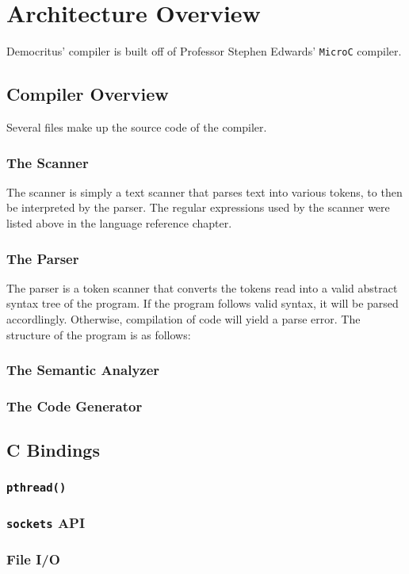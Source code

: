 \chapter{Architecture Overview}
	Democritus' compiler is built off of Professor Stephen Edwards' \texttt{MicroC} compiler. 

\section{Compiler Overview}
  Several files make up the source code of the compiler. 
	\subsection{The Scanner}
    The scanner is simply a text scanner that parses text into various tokens, to then be interpreted by the parser. The regular expressions used by the scanner were listed above in the language reference chapter. 

	\subsection{The Parser}
    The parser is a token scanner that converts the tokens read into a valid abstract syntax tree of the program. If the program follows valid syntax, it will be parsed accordlingly. Otherwise, compilation of code will yield a parse error. The structure of the program is as follows:

	\subsection{The Semantic Analyzer}

	\subsection{The Code Generator}

\section{C Bindings}

	\subsection{\texttt{pthread()}}

	\subsection{\texttt{sockets} API}

	\subsection{File I/O}

